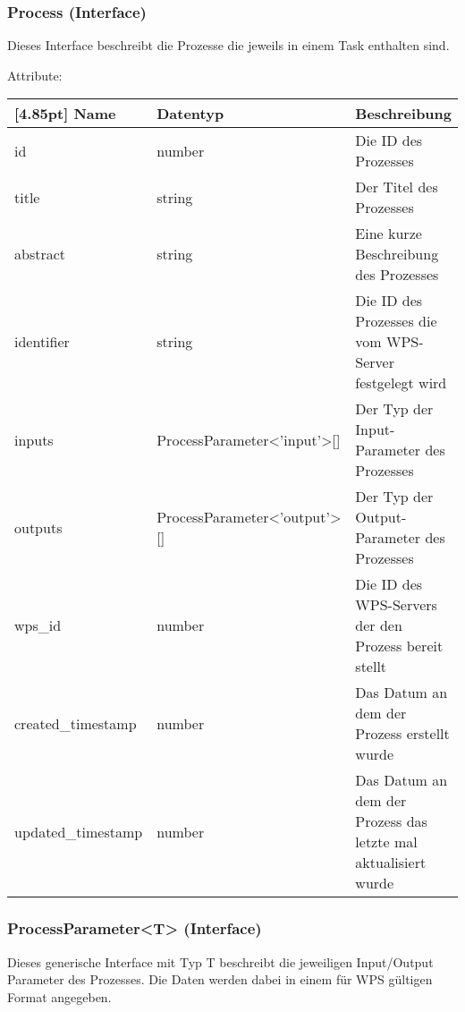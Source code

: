 			\subsubsection{Process (Interface)}
			
			Dieses Interface beschreibt die Prozesse die jeweils in einem Task enthalten sind.\newline
			
			Attribute:
			\begin{center}
				\renewcommand{\arraystretch}{1.5}
				\setlength\tabcolsep{5pt}
				\begin{tabularx}{\textwidth}{|l|l|X|}
					\hline
					\rowcolor[gray]{0.75}[4.85pt]					
					Name & Datentyp & Beschreibung \\ \hline
					id & number & Die ID des Prozesses \\ \hline
					title & string & Der Titel des Prozesses \\ \hline
					abstract & string & Eine kurze Beschreibung des Prozesses \\ \hline
					identifier & string & Die ID des Prozesses die vom WPS-Server festgelegt wird \\ \hline
					inputs & ProcessParameter<'input'>[] & Der Typ der Input-Parameter des Prozesses \\ \hline
					outputs & ProcessParameter<'output'>[] & Der Typ der Output-Parameter des Prozesses \\ \hline
					wps_id & number & Die ID des WPS-Servers der den Prozess bereit stellt \\ \hline
					created_timestamp & number & Das Datum an dem der Prozess erstellt wurde \\ \hline
					updated_timestamp & number & Das Datum an dem der Prozess das letzte mal aktualisiert wurde \\ \hline
				\end{tabularx}
			\end{center}
				
			\subsubsection{ProcessParameter<T> (Interface)}
			
			Dieses generische Interface mit Typ T beschreibt die jeweiligen Input/Output Parameter des Prozesses. Die Daten werden dabei in einem für WPS gültigen Format angegeben.\newline
			
